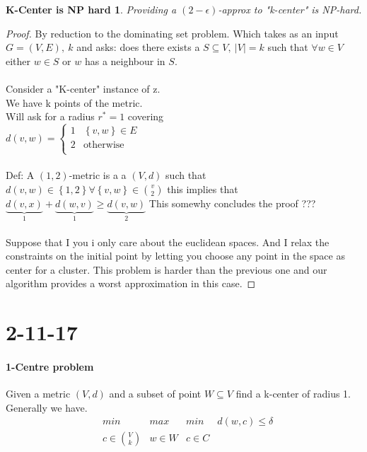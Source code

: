 \documentclass[]{article}
\begin{document}
\newtheorem{kcenterhardness}{K-Center is NP hard}
\begin{kcenterhardness}
	Providing a $ (2 - \epsilon) $-approx to "k-center" is NP-hard.
\end{kcenterhardness}
\begin{proof}
	By reduction to the dominating set problem. Which takes as an input $ G=(V,E),\ k $ and asks: does there exists a $ S \subseteq V,\ |V| = k$ such that $ \forall w \in V $ either $ w \in S $ or $ w $ has a neighbour in $ S $.\\\\
	Consider a "K-center" instance of z.\\
	We have k points of the metric.\\
	Will ask for a radius $ r^* = 1 $ covering\\
	$ d(v,w) = \begin{cases}
	1&\left\{v,w\right\} \in E\\
	2&\text{otherwise}\\
	\end{cases}  $\\\\
	Def: A $ (1,2) $-metric is a a $ (V,d) $ such that $ d(v,w) \in \left\{ 1,2 \right\} \forall \left\{v,w\right\} \in {v \choose 2}$ this implies that $ \underbrace{d(v,x)}_{1} + \underbrace{d(w,v)}_{1} \geq \underbrace{d(v,w)}_{2} $ This somewhy concludes the proof ???\\\\
	Suppose that I you i only care about the euclidean spaces. And I relax the constraints on the initial point by letting you choose any point in the space as center for a cluster. This problem is harder than the previous one and our algorithm provides a worst approximation in this case. 
\end{proof}

\section{2-11-17}
\paragraph{1-Centre problem} Given a metric $ (V,d) $ and a subset of point $ W \subseteq V $ find a k-center of radius 1. Generally we have.
\begin{align*}
&min\ &max\ &min\ &d(w, c) \leq \delta\\
&c \in {V \choose k} &w \in W &c\in C
\end{align*}
\end{document}
